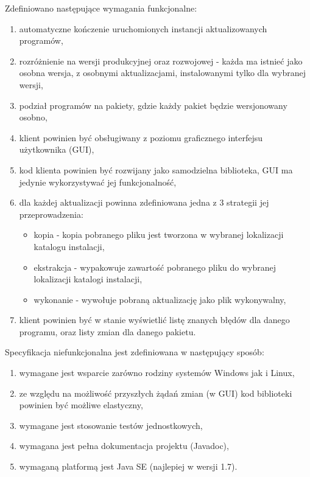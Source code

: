 \documentclass[polish,12pt,titlepage]{article}
\begin{document}
Zdefiniowano następujące wymagania funkcjonalne:
\begin{enumerate}
  \item automatyczne kończenie uruchomionych instancji aktualizowanych
    programów,
  \item rozróżnienie na wersji produkcyjnej oraz rozwojowej - każda ma
    istnieć jako osobna wersja, z osobnymi aktualizacjami, instalowanymi tylko
    dla wybranej wersji,
  \item podział programów na pakiety, gdzie każdy pakiet będzie wersjonowany
    osobno,
  \item klient powinien być obsługiwany z poziomu graficznego interfejsu
    użytkownika (GUI),
  \item kod klienta powinien być rozwijany jako samodzielna biblioteka,
    GUI ma jedynie wykorzystywać jej funkcjonalność,
  \item dla każdej aktualizacji powinna zdefiniowana jedna z 3 strategii jej
    przeprowadzenia:
  \begin{itemize}
    \item kopia - kopia pobranego pliku jest tworzona w wybranej lokalizacji
      katalogu instalacji,
    \item ekstrakcja - wypakowuje zawartość pobranego pliku do wybranej
      lokalizacji katalogi instalacji,
    \item wykonanie - wywołuje pobraną aktualizację jako plik wykonywalny,
  \end{itemize}
  \item klient powinien być w stanie wyświetlić listę znanych błędów dla
    danego programu, oraz listy zmian dla danego pakietu.
\end{enumerate}

Specyfikacja niefunkcjonalna jest zdefiniowana w następujący sposób:
\begin{enumerate}
  \item wymagane jest wsparcie zarówno rodziny systemów Windows jak i Linux,
  \item ze względu na możliwość przyszłych żądań zmian (w GUI) kod biblioteki
    powinien być możliwe elastyczny,
  \item wymagane jest stosowanie testów jednostkowych,
  \item wymagana jest pełna dokumentacja projektu (Javadoc),
  \item wymaganą platformą jest Java SE (najlepiej w wersji 1.7).
\end{enumerate}
\end{document}
